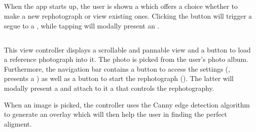 \subsection{}


When the app starts up, the user is shown a  which
offers a choice whether to make a new rephotograph or view existing ones.
Clicking the  button will trigger a segue to a
, while tapping  will modally
present an .


\subsection{}

This view controller displays a scrollable and pannable view and a button
 to load a reference photograph into it. The
photo is picked from the user's photo album.  Furthermore, the navigation bar
contains a button to access the settings
(, presents a
) as well as a button to start the rephotograph
(). The latter
will modally present a  and attach to it a
 that controls the rephotography.


When an image is picked, the controller uses the Canny edge detection algorithm
\citep{canny1986} to generate an overlay which will then help the user in
finding the perfect aligment.


\subsection{}

